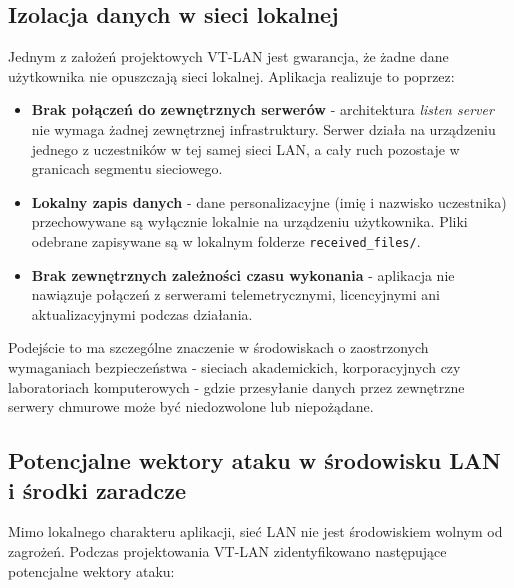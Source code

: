 \subsection*{Izolacja danych w sieci lokalnej}

Jednym z założeń projektowych VT-LAN jest gwarancja, że żadne dane
użytkownika nie opuszczają sieci lokalnej. Aplikacja realizuje to poprzez:

\begin{itemize}
    \item \textbf{Brak połączeń do zewnętrznych serwerów} - architektura
    \textit{listen server} nie wymaga żadnej zewnętrznej infrastruktury.
    Serwer działa na urządzeniu jednego z uczestników w tej samej sieci LAN,
    a cały ruch pozostaje w granicach segmentu sieciowego.

    \item \textbf{Lokalny zapis danych} - dane personalizacyjne
    (imię i nazwisko uczestnika) przechowywane są wyłącznie lokalnie
    na urządzeniu użytkownika. Pliki odebrane zapisywane są w lokalnym
    folderze \texttt{received\_files/}.

    \item \textbf{Brak zewnętrznych zależności czasu wykonania} -
    aplikacja nie nawiązuje połączeń z serwerami telemetrycznymi,
    licencyjnymi ani aktualizacyjnymi podczas działania.
\end{itemize}

Podejście to ma szczególne znaczenie w środowiskach o zaostrzonych
wymaganiach bezpieczeństwa - sieciach akademickich, korporacyjnych
czy laboratoriach komputerowych - gdzie przesyłanie danych przez
zewnętrzne serwery chmurowe może być niedozwolone lub niepożądane.

\subsection*{Potencjalne wektory ataku w środowisku LAN i środki zaradcze}

Mimo lokalnego charakteru aplikacji, sieć LAN nie jest środowiskiem
wolnym od zagrożeń. Podczas projektowania VT-LAN zidentyfikowano
następujące potencjalne wektory ataku:

